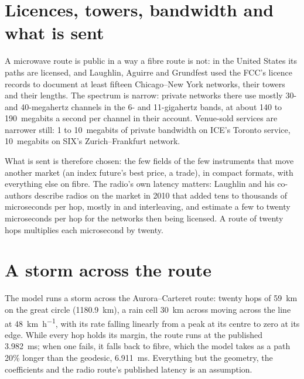 \section{Licences, towers, bandwidth and what is sent}

A microwave route is public in a way a fibre route is not: in the United States its paths are licensed, and Laughlin, Aguirre and Grundfest used
the FCC's licence records to document at least fifteen Chicago--New York networks, their towers and their lengths. The spectrum is narrow:
private networks there use mostly 30- and 40-megahertz channels in the 6- and 11-gigahertz bands, at about 140 to 190~megabits a second per
channel in their account. Venue-sold services are narrower still: 1 to 10~megabits of private bandwidth on ICE's Toronto service, 10~megabits on
SIX's Zurich--Frankfurt network.

What is sent is therefore chosen: the few fields of the few instruments that move another market (an index future's best price, a trade), in
compact formats, with everything else on fibre. The radio's own latency matters: Laughlin and his co-authors describe radios on the market in
2010 that added tens to thousands of microseconds per hop, mostly in  and interleaving, and estimate a few to twenty
microseconds per hop for the networks then being licensed. A route of twenty hops multiplies each microsecond by twenty.

\section{A storm across the route}

The model runs a storm across the Aurora--Carteret route: twenty hops of \qty{59}{\kilo\metre} on the great circle (\qty{1180.9}{\kilo\metre}),
a rain cell \qty{30}{\kilo\metre} across moving across the line at \qty{48}{\kilo\metre\per\hour}, with its rate falling linearly from a peak at
its centre to zero at its edge. While every hop holds its margin, the route runs at the published \qty{3.982}{\milli\second}; when one fails, it
falls back to fibre, which the model takes as a path 20\% longer than the geodesic, \qty{6.911}{\milli\second}. Everything but the geometry,
the coefficients and the radio route's published latency is an assumption.

